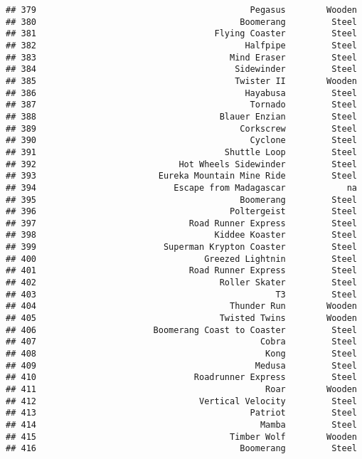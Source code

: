 \documentclass[
]{article}
\begin{document}
\begin{verbatim}
## 379                                          Pegasus        Wooden
## 380                                        Boomerang         Steel
## 381                                   Flying Coaster         Steel
## 382                                         Halfpipe         Steel
## 383                                      Mind Eraser         Steel
## 384                                       Sidewinder         Steel
## 385                                       Twister II        Wooden
## 386                                         Hayabusa         Steel
## 387                                          Tornado         Steel
## 388                                    Blauer Enzian         Steel
## 389                                        Corkscrew         Steel
## 390                                          Cyclone         Steel
## 391                                     Shuttle Loop         Steel
## 392                            Hot Wheels Sidewinder         Steel
## 393                        Eureka Mountain Mine Ride         Steel
## 394                           Escape from Madagascar            na
## 395                                        Boomerang         Steel
## 396                                      Poltergeist         Steel
## 397                              Road Runner Express         Steel
## 398                                   Kiddee Koaster         Steel
## 399                         Superman Krypton Coaster         Steel
## 400                                 Greezed Lightnin         Steel
## 401                              Road Runner Express         Steel
## 402                                    Roller Skater         Steel
## 403                                               T3         Steel
## 404                                      Thunder Run        Wooden
## 405                                    Twisted Twins        Wooden
## 406                       Boomerang Coast to Coaster         Steel
## 407                                            Cobra         Steel
## 408                                             Kong         Steel
## 409                                           Medusa         Steel
## 410                               Roadrunner Express         Steel
## 411                                             Roar        Wooden
## 412                                Vertical Velocity         Steel
## 413                                          Patriot         Steel
## 414                                            Mamba         Steel
## 415                                      Timber Wolf        Wooden
## 416                                        Boomerang         Steel

\end{verbatim}
\end{document}
